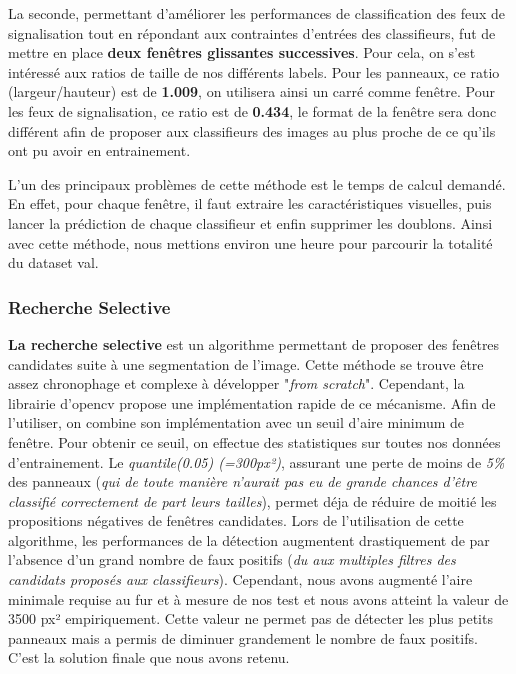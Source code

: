 \documentclass[a4paper,11pt]{article}
\begin{document}
\vspace{2mm}

\noindent La seconde, permettant d'améliorer les performances de classification des feux de signalisation tout en répondant aux contraintes d'entrées des classifieurs, fut de mettre en place \textbf{deux fenêtres glissantes successives}. Pour cela, on s'est intéressé aux ratios de taille de nos différents labels. Pour les panneaux, ce ratio (largeur/hauteur) est de \textbf{1.009}, on utilisera ainsi un carré comme fenêtre. Pour les feux de signalisation, ce ratio est de \textbf{0.434}, le format de la fenêtre sera donc différent afin de proposer aux classifieurs des images au plus proche de ce qu'ils ont pu avoir en entrainement.

\vspace{2mm}

\noindent L'un des principaux problèmes de cette méthode est le temps de calcul demandé. En effet, pour chaque fenêtre, il faut extraire les caractéristiques visuelles, puis lancer la prédiction de chaque classifieur et enfin supprimer les doublons. Ainsi avec cette méthode, nous mettions environ une heure pour parcourir la totalité du dataset val.

\subsubsection{Recherche Selective}

\textbf{La recherche selective} est un algorithme permettant de proposer des fenêtres candidates suite à une segmentation de l'image. Cette méthode se trouve être assez chronophage et complexe à développer "\textit{from scratch}". Cependant, la librairie d'opencv propose une implémentation rapide de ce mécanisme. Afin de l'utiliser, on combine son implémentation avec un seuil d'aire minimum de fenêtre. Pour obtenir ce seuil, on effectue des statistiques sur toutes nos données d'entrainement. Le \textit{quantile(0.05) (=300px²)}, assurant une perte de moins de \textit{5\%} des panneaux (\textit{qui de toute manière n'aurait pas eu de grande chances d'être classifié correctement de part leurs tailles}), permet déja de réduire de moitié les propositions négatives de fenêtres candidates. Lors de l'utilisation de cette algorithme, les performances de la détection augmentent drastiquement de par l'absence d'un grand nombre de faux positifs (\textit{du aux multiples filtres des candidats proposés aux classifieurs}). Cependant, nous avons augmenté l'aire minimale requise au fur et à mesure de nos test et nous avons atteint la valeur de 3500 px² empiriquement. Cette valeur ne permet pas de détecter les plus petits panneaux mais a permis de diminuer grandement le nombre de faux positifs. C'est la solution finale que nous avons retenu.
\end{document}
